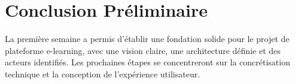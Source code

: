 \documentclass[12pt, a4paper]{article}
\begin{document}
\section{Conclusion Préliminaire}
La première semaine a permis d'établir une fondation solide pour le projet de plateforme e-learning, avec une vision claire, une architecture définie et des acteurs identifiés. Les prochaines étapes se concentreront sur la concrétisation technique et la conception de l'expérience utilisateur.
\end{document}
